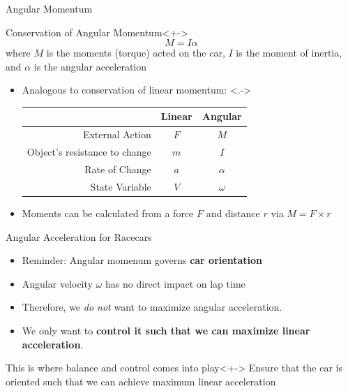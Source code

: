 \documentclass[aspectratio=169]{beamer}
\begin{document}
\begin{frame}{Angular Momentum}
    \begin{block}{Conservation of Angular Momentum}<+->
        \[M=I\alpha\]
        where \(M\) is the moments (torque) acted on the car, \(I\) is the moment of inertia, and \(\alpha\) is the angular acceleration
    \end{block}
    \begin{itemize}
        \item<+-> Analogous to conservation of linear momentum:
            \onslide<.->{
                \begin{table}[]
                    \begin{tabular}{r|cc}
                                            & Linear & Angular     \\ \hline
                        External Action               & \(F\)  & \(M\)       \\
                        Object's resistance to change & \(m\)  & \(I\)       \\
                        Rate of Change                & \(a\)  & \(\alpha \) \\
                        State Variable                & \(V\)  & \(\omega\) 
                    \end{tabular}
                \end{table}
            }
        \item<+-> Moments can be calculated from a force \(F\) and distance \(r \) via \(M=F\times r\)
    \end{itemize}

\end{frame}

\begin{frame}{Angular Acceleration for Racecars}
    \begin{itemize}
        \item<+-> Reminder: Angular momenum governs \textbf{car orientation}
        \item<+-> Angular velocity \(\omega\) has no direct impact on lap time
        \item<+-> Therefore, we \textit{do not} want to maximize angular acceleration.
        \item<+-> We only want to \textbf{control it such that we can maximize linear acceleration}.
    \end{itemize}
    \begin{alertblock}{This is where balance and control comes into play}<+->
        Ensure that the car is oriented such that we can achieve maximum linear acceleration
    \end{alertblock}
\end{frame}
\end{document}
